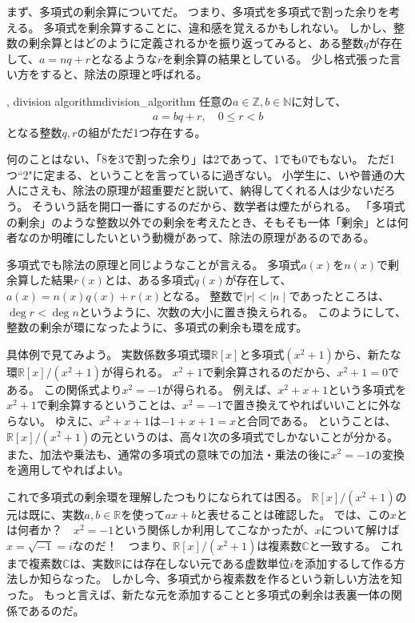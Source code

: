 まず、多項式の剰余算についてだ。
つまり、多項式を多項式で割った余りを考える。
多項式を剰余算することに、違和感を覚えるかもしれない。
しかし、整数の剰余算とはどのように定義されるかを振り返ってみると、ある整数$q$が存在して、$a = nq + r$となるような$r$を剰余算の結果としている。
少し格式張った言い方をすると、除法の原理と呼ばれる。

\begin{Theo}{, division algorithm}{division_algorithm}
任意の$a\in\mathbb{Z},b\in\mathbb{N}$に対して、
\begin{align*}
a = bq + r, \quad 0 \le r < b
\end{align*}
となる整数$q,r$の組がただ1つ存在する。
\end{Theo}

何のことはない、「8を3で割った余り」は2であって、1でも0でもない。
ただ1つ``2"に定まる、ということを言っているに過ぎない。
小学生に、いや普通の大人にさえも、除法の原理が超重要だと説いて、納得してくれる人は少ないだろう。
そういう話を開口一番にするのだから、数学者は煙たがられる。
「多項式の剰余」のような整数以外での剰余を考えたとき、そもそも一体「剰余」とは何者なのか明確にしたいという動機があって、除法の原理があるのである。

多項式でも除法の原理と同じようなことが言える。
多項式$a(x)$を$n(x)$で剰余算した結果$r(x)$とは、ある多項式$q(x)$が存在して、$a(x) = n(x)q(x) + r(x)$となる。
整数で$\mid r\mid < \mid n \mid$であったところは、$\deg r < \deg n$というように、次数の大小に置き換えられる。
このようにして、整数の剰余が環になったように、多項式の剰余も環を成す。

具体例で見てみよう。
実数係数多項式環$\mathbb{R}[x]$と多項式$(x^2+1)$から、新たな環$\mathbb{R}[x]/(x^2+1)$が得られる。
$x^2+1$で剰余算されるのだから、$x^2+1=0$である。
この関係式より$x^2=-1$が得られる。
例えば、$x^2+x+1$という多項式を$x^2+1$で剰余算するということは、$x^2=-1$で置き換えてやればいいことに外ならない。
ゆえに、$x^2+x+1$は$-1+x+1=x$と合同である。
ということは、$\mathbb{R}[x]/(x^2+1)$の元というのは、高々1次の多項式でしかないことが分かる。
また、加法や乗法も、通常の多項式の意味での加法・乗法の後に$x^2=-1$の変換を適用してやればよい。

これで多項式の剰余環を理解したつもりになられては困る。
$\mathbb{R}[x]/(x^2+1)$の元は既に、実数$a,b \in \mathbb{R}$を使って$ax+b$と表せることは確認した。
では、この$x$とは何者か？　$x^2=-1$という関係しか利用してこなかったが、$x$について解けば$x=\sqrt{-1}=i$なのだ！　つまり、$\mathbb{R}[x]/(x^2+1)$は複素数$\mathbb{C}$と一致する。
これまで複素数$\mathbb{C}$は、実数$\mathbb{R}$には存在しない元である虚数単位$i$を添加するして作る方法しか知らなった。
しかし今、多項式から複素数を作るという新しい方法を知った。
もっと言えば、新たな元を添加することと多項式の剰余は表裏一体の関係であるのだ。

